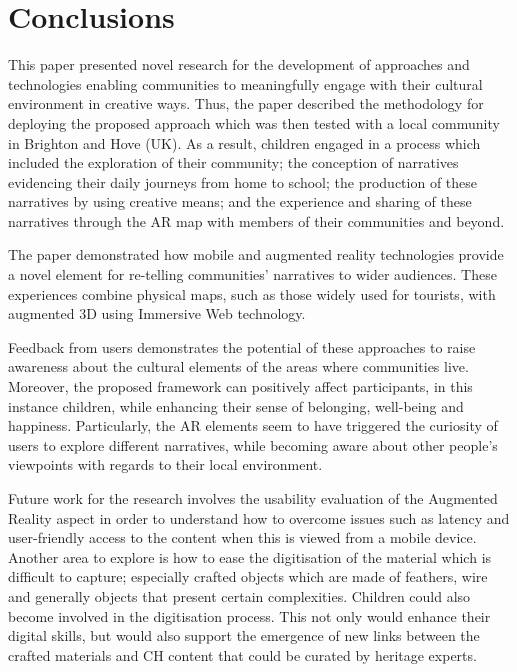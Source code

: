 \documentclass[acmlarge,screen,dvipsnames]{acmart}
\begin{document}
\section{Conclusions} \label{conc} This paper presented novel research for the
development of approaches and technologies enabling communities to
meaningfully engage with their cultural environment in creative ways. Thus,
the paper described the methodology for deploying the proposed approach which was then tested
with a local community in Brighton and Hove (UK). As a result, children
engaged in a process which included the exploration of their community; the conception of narratives evidencing their daily journeys from home to school; the production of these narratives by using creative means; and the experience and sharing of these narratives through the AR map with members of their communities and beyond.

The paper demonstrated how mobile and augmented reality technologies provide a
novel element for re-telling communities' narratives to wider audiences. These
experiences combine physical maps, such as those widely used for tourists,
with augmented 3D using Immersive Web technology. 

Feedback from users demonstrates the potential of these approaches to raise
awareness about the cultural elements of the areas where communities live. Moreover, the proposed framework can positively affect participants, in this instance children, while enhancing their sense of belonging, well-being and happiness. Particularly, the AR elements seem to have triggered the curiosity of users to explore different narratives, while becoming aware about other people's viewpoints with regards to their local environment.

Future work for the research involves the usability evaluation of the Augmented Reality aspect
in order to understand how to overcome issues such as latency and
user-friendly access to the content when this is viewed from a mobile device.
Another area to explore is how to ease the digitisation of the material which is difficult to capture; especially crafted objects which are made of feathers, wire and generally objects that present certain complexities. Children could also
become involved in the digitisation process. This not only would enhance their digital
skills, but would also support the emergence of new links between the crafted materials and
CH content that could be curated by heritage experts. 
\end{document}
